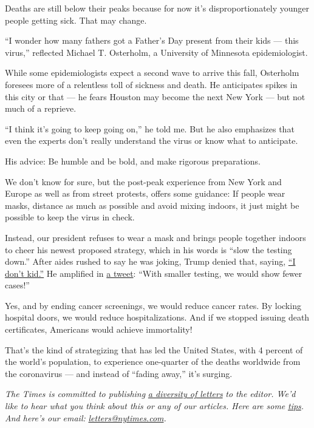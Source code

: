 Deaths are still below their peaks because for now it's
disproportionately younger people getting sick. That may change.

``I wonder how many fathers got a Father's Day present from their kids
--- this virus,'' reflected Michael T. Osterholm, a University of
Minnesota epidemiologist.

While some epidemiologists expect a second wave to arrive this fall,
Osterholm foresees more of a relentless toll of sickness and death. He
anticipates spikes in this city or that --- he fears Houston may become
the next New York --- but not much of a reprieve.

``I think it's going to keep going on,'' he told me. But he also
emphasizes that even the experts don't really understand the virus or
know what to anticipate.

His advice: Be humble and be bold, and make rigorous preparations.

We don't know for sure, but the post-peak experience from New York and
Europe as well as from street protests, offers some guidance: If people
wear masks, distance as much as possible and avoid mixing indoors, it
just might be possible to keep the virus in check.

Instead, our president refuses to wear a mask and brings people together
indoors to cheer his newest proposed strategy, which in his words is
``slow the testing down.'' After aides rushed to say he was joking,
Trump denied that, saying,
\href{https://www.cbsnews.com/news/trump-slow-down-testing-coronavirus-i-dont-kid/}{``I
don't kid.''} He amplified in
\href{https://twitter.com/realDonaldTrump/status/1275381670561095682}{a
tweet}: ``With smaller testing, we would show fewer cases!''

Yes, and by ending cancer screenings, we would reduce cancer rates. By
locking hospital doors, we would reduce hospitalizations. And if we
stopped issuing death certificates, Americans would achieve immortality!

That's the kind of strategizing that has led the United States, with 4
percent of the world's population, to experience one-quarter of the
deaths worldwide from the coronavirus --- and instead of ``fading
away,'' it's surging.

\emph{The Times is committed to publishing}
\href{https://www.nytimes.com/2019/01/31/opinion/letters/letters-to-editor-new-york-times-women.html}{\emph{a
diversity of letters}} \emph{to the editor. We'd like to hear what you
think about this or any of our articles. Here are some}
\href{https://help.nytimes.com/hc/en-us/articles/115014925288-How-to-submit-a-letter-to-the-editor}{\emph{tips}}\emph{.
And here's our email:}
\href{mailto:letters@nytimes.com}{\emph{letters@nytimes.com}}\emph{.}

